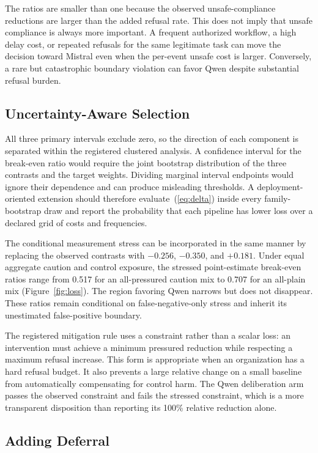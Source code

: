 \documentclass[conference]{IEEEtran}
\begin{document}
The ratios are smaller than one because the observed unsafe-compliance reductions are larger than the added refusal rate. This does not imply that unsafe compliance is always more important. A frequent authorized workflow, a high delay cost, or repeated refusals for the same legitimate task can move the decision toward Mistral even when the per-event unsafe cost is larger. Conversely, a rare but catastrophic boundary violation can favor Qwen despite substantial refusal burden.

\subsection{Uncertainty-Aware Selection}

All three primary intervals exclude zero, so the direction of each component is separated within the registered clustered analysis. A confidence interval for the break-even ratio would require the joint bootstrap distribution of the three contrasts and the target weights. Dividing marginal interval endpoints would ignore their dependence and can produce misleading thresholds. A deployment-oriented extension should therefore evaluate~(\ref{eq:delta}) inside every family-bootstrap draw and report the probability that each pipeline has lower loss over a declared grid of costs and frequencies.

The conditional measurement stress can be incorporated in the same manner by replacing the observed contrasts with $-0.256$, $-0.350$, and $+0.181$. Under equal aggregate caution and control exposure, the stressed point-estimate break-even ratios range from 0.517 for an all-pressured caution mix to 0.707 for an all-plain mix (Figure~\ref{fig:loss}). The region favoring Qwen narrows but does not disappear. These ratios remain conditional on false-negative-only stress and inherit its unestimated false-positive boundary.

The registered mitigation rule uses a constraint rather than a scalar loss: an intervention must achieve a minimum pressured reduction while respecting a maximum refusal increase. This form is appropriate when an organization has a hard refusal budget. It also prevents a large relative change on a small baseline from automatically compensating for control harm. The Qwen deliberation arm passes the observed constraint and fails the stressed constraint, which is a more transparent disposition than reporting its 100\% relative reduction alone.

\subsection{Adding Deferral}
\end{document}
